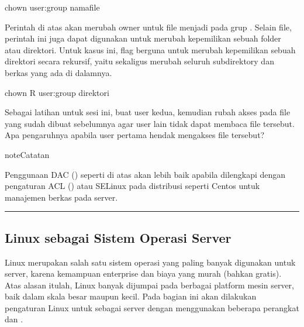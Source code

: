 \documentclass[letterpaper,10pt,english]{sphinxmanual}
\begin{document}
\begin{sphinxVerbatim}[commandchars=\\\{\}]
chown user\PYG{o}{[}:group\PYG{o}{]} namafile
\end{sphinxVerbatim}

Perintah di atas akan merubah owner untuk file  menjadi  pada grup . Selain file, perintah ini juga dapat digunakan untuk merubah kepemilikan sebuah folder atau direktori. Untuk kasus ini, flag  berguna untuk merubah kepemilikan sebuah direktori secara rekursif, yaitu sekaligus merubah seluruh subdirektory dan berkas yang ada di dalamnya.

\begin{sphinxVerbatim}[commandchars=\\\{\}]
chown \PYGZhy{}R user\PYG{o}{[}:group\PYG{o}{]} direktori
\end{sphinxVerbatim}

Sebagai latihan untuk sesi ini, buat user kedua, kemudian rubah akses pada file  yang sudah dibuat sebelumnya agar user lain tidak dapat membaca file tersebut. Apa pengaruhnya apabila user pertama hendak mengakses file tersebut?

\begin{sphinxadmonition}{note}{Catatan}

Penggunaan DAC () seperti di atas akan lebih baik apabila dilengkapi dengan pengaturan ACL () atau SELinux pada distribusi seperti Centos untuk manajemen berkas pada server.
\end{sphinxadmonition}


\bigskip\hrule\bigskip



\subsection{Linux sebagai Sistem Operasi Server}
\label{\detokenize{sesi1/linuxserver:linux-sebagai-sistem-operasi-server}}\label{\detokenize{sesi1/linuxserver::doc}}
Linux merupakan salah satu sistem operasi yang paling banyak digunakan untuk server, karena kemampuan enterprise dan biaya yang murah (bahkan gratis). Atas alasan itulah, Linux banyak dijumpai pada berbagai platform mesin server, baik dalam skala besar maupun kecil.  Pada bagian ini akan dilakukan pengaturan Linux untuk sebagai server dengan menggunakan beberapa perangkat  dan .
\end{document}
